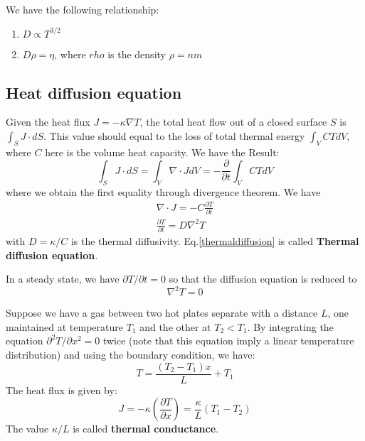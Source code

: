 \documentclass{article}
\begin{document}
We have the following relationship:
\begin{enumerate}
    \item $ D \propto T^{3/2}$
    \item $D \rho = \eta $, where $rho$ is the density $\rho = nm$
\end{enumerate}

\subsection*{Heat diffusion equation}
Given the heat flux $J = - \kappa \nabla T$, the total heat flow out of a closed surface $S$ is $\int_S J \cdot dS$.
This value should equal to the loss of total thermal energy $\int_V CT dV$, where $C$ here is the volume heat capacity. 
We have the Result:
\begin{equation}
    \int_S J \cdot dS = \int_V \nabla \cdot J dV = -\frac{\partial}{\partial t} \int_V CT dV
\end{equation}
where we obtain the first equality through divergence theorem. We have
\begin{align}
    \nabla \cdot J = -C \frac{\partial T}{\partial t} \\
    \frac{\partial T}{\partial t} = D \nabla^2 T \label{thermaldiffusion}
\end{align}
with $D = \kappa/C$ is the thermal diffusivity.
Eq.\ref{thermaldiffusion} is called \textbf{Thermal diffusion equation}.

In a steady state, we have $\partial T / \partial t = 0 $ so that the 
diffusion equation is reduced to 
\begin{equation}
    \nabla^2 T = 0
\end{equation}

Suppose we have a gas between two hot plates separate with a distance $L$, 
one maintained at temperature $T_1$ and the other at $T_2 < T_1$. By integrating
the equation $\partial^2 T / \partial x^2 = 0$ twice 
(note that this equation imply a linear temperature distribution)
and using the boundary condition,
we have:
\begin{equation}
    T = \frac{(T_2-T_1)x}{L} + T_1 
\end{equation}
The heat flux is given by:
\begin{equation}
    J = - \kappa \left( \frac{\partial T}{\partial x} \right) = \frac{\kappa}{L} (T_1 - T_2)
\end{equation}
The value $\kappa / L$ is called \textbf{thermal conductance}.
\end{document}

